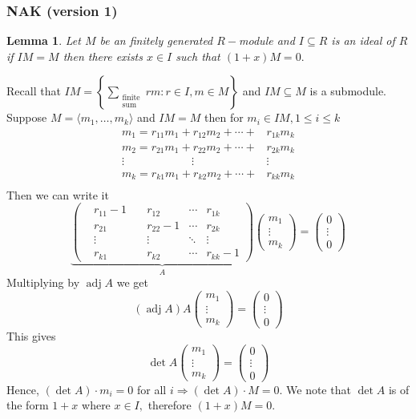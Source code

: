 \documentclass[11pt]{amsart}
\newtheorem{lemma}[theorem]{Lemma}%
\begin{document}
\subsubsection{NAK (version 1)}
\begin{lemma}
Let $M$ be an finitely generated $R-$module and $I\subseteq R$ is an ideal of $R$ if $IM=M$ then there exists $x\in I$ such that $(1+x)M=0.$
\end{lemma}
Recall that $IM=\left\lbrace \displaystyle\sum_{\substack{\text{finite}\\ \text{sum}}}rm:r\in I,m\in M\right\rbrace$ and $IM\subseteq M$ is a submodule.\\
\proof Suppose $M=\langle m_1,\dots ,m_k\rangle$ and $IM=M$ then for $m_i\in IM, 1\leq i\leq k$ \begin{align*}
m_1=r_{11}m_1+r_{12}m_2+\cdots +&r_{1k}m_k\\
m_2=r_{21}m_1+r_{22}m_2+\cdots +&r_{2k}m_k\\
\vdots \quad\quad\quad\quad\quad\quad\vdots\quad\quad\quad\quad\quad &\vdots\\
m_k=r_{k1}m_1+r_{k2}m_2+\cdots +&r_{kk}m_k\\
\end{align*}
Then we can write it $$\underbrace{\begin{pmatrix}
&r_{11}-1\quad &r_{12} \quad &\cdots  &r_{1k}\\
&r_{21}\quad &r_{22}-1 &\cdots  &r_{2k}\\
&\vdots \quad &\vdots &\ddots &\vdots\\
&r_{k1} \quad &r_{k2} &\cdots  &r_{kk}-1
\end{pmatrix}}_{A}
\begin{pmatrix}
m_{1}\\
\vdots\\
m_k
\end{pmatrix}=\begin{pmatrix}
0\\
\vdots\\
0
\end{pmatrix}$$
Multiplying by $\operatorname{adj}A$ we get $$(\operatorname{adj}A)A\begin{pmatrix}
m_{1}\\
\vdots\\
m_k
\end{pmatrix}=\begin{pmatrix}
0\\
\vdots\\
0
\end{pmatrix}$$ This gives $$\det A\begin{pmatrix}
m_{1}\\
\vdots\\
m_k
\end{pmatrix}=\begin{pmatrix}
0\\
\vdots\\
0
\end{pmatrix}$$
Hence, $(\det A)\cdot m_i=0$ for all $i \Rightarrow (\det A)\cdot M=0.$ We note that $\det A$ is of the form $1+x$ where $x\in I,$ therefore $(1+x)M=0.$
\end{document}
